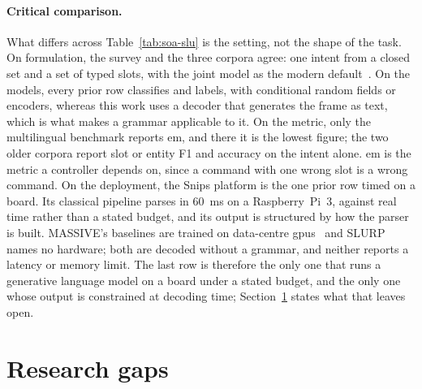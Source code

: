 \paragraph{Critical comparison.} What differs across Table~\ref{tab:soa-slu} is the setting, not
the shape of the task. On formulation, the survey and the three corpora agree: one intent from a
closed set and a set of typed slots, with the joint model as the modern default~\cite{qin2021}.
On the models, every prior row classifies and labels, with conditional random fields or
encoders, whereas this work uses a decoder that generates the frame as text, which is what makes
a grammar applicable to it. On the metric, only the multilingual benchmark reports \gls{em}, and
there it is the lowest figure; the two older corpora report slot or entity F1 and accuracy on the
intent alone. \Gls{em} is the metric a controller depends on, since a command with one wrong
slot is a wrong command. On the deployment, the Snips platform is the one prior row timed on a
board. Its classical pipeline parses in 60~ms on a Raspberry~Pi~3, against real time rather than
a stated budget, and its output is structured by how the parser is built. MASSIVE's baselines are
trained on data-centre \glspl{gpu}~\cite{massive} and SLURP names no hardware; both are decoded
without a grammar, and neither reports a latency or memory limit. The last row is therefore the
only one that runs a generative language model on a board under a stated budget, and the only
one whose output is constrained at decoding time; Section~\ref{sec:research-gaps} states what
that leaves open.

\clearpage
\section{Research gaps}
\label{sec:research-gaps}

